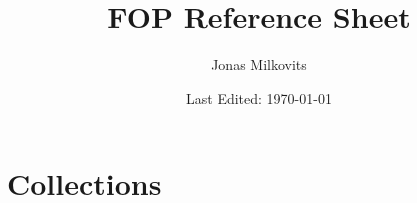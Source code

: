 

\renewcommand{\arraystretch}{1.75} 


\begin{titlepage}
  \title{FOP Reference Sheet} %
  \author{Jonas Milkovits}
  \date{Last Edited: \today}
\end{titlepage}



\maketitle
{} %
\tableofcontents
\clearpage
{} %

\section{Collections}
